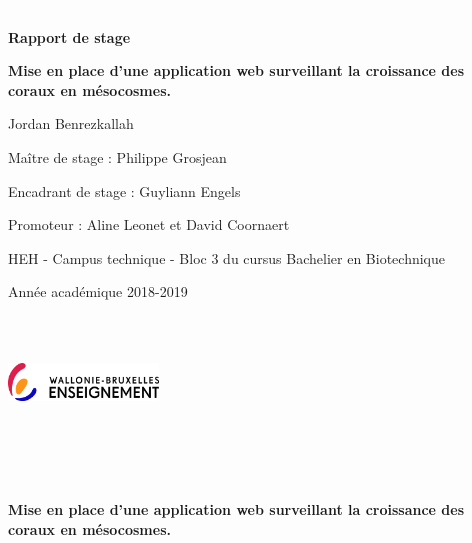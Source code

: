 \documentclass[]{report}
\begin{document}
\begin{centering}
\textcolor{white}{.}

\vspace{2.5 cm}

\Huge

{\bf Rapport de stage}

\vspace{1 cm}

\huge 
{\bf Mise en place d'une application web surveillant la croissance des coraux en mésocosmes.}

\vspace{1 cm}

\Large

Jordan Benrezkallah

\vspace{2 cm}

\normalsize
Maître de stage : Philippe Grosjean

Encadrant de stage : Guyliann Engels

Promoteur : Aline Leonet et David Coornaert


\vspace{3.5 cm}

\normalsize
HEH - Campus technique -
Bloc 3 du cursus Bachelier en Biotechnique

Année académique 2018-2019

\end {centering}

\includegraphics[width=4cm,height=3.5cm]{../image/fede.jpg}

\newpage

\null
\newpage

\begin{centering}



\textcolor{white}{.}





\vfill

\huge 
{\bf Mise en place d'une application web surveillant la croissance des coraux en mésocosmes.}

\vfill


\end {centering}
\end{document}
